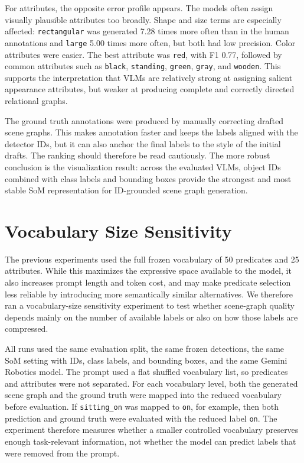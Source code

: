For attributes, the opposite error profile appears. The models often assign visually plausible attributes too broadly. Shape and size terms are especially affected: \texttt{rectangular} was generated 7.28 times more often than in the human annotations and \texttt{large} 5.00 times more often, but both had low precision. Color attributes were easier. The best attribute was \texttt{red}, with F1 0.77, followed by common attributes such as \texttt{black}, \texttt{standing}, \texttt{green}, \texttt{gray}, and \texttt{wooden}. This supports the interpretation that VLMs are relatively strong at assigning salient appearance attributes, but weaker at producing complete and correctly directed relational graphs.

The ground truth annotations were produced by manually correcting drafted scene graphs. This makes annotation faster and keeps the labels aligned with the detector IDs, but it can also anchor the final labels to the style of the initial drafts. The ranking should therefore be read cautiously. The more robust conclusion is the visualization result: across the evaluated VLMs, object IDs combined with class labels and bounding boxes provide the strongest and most stable SoM representation for ID-grounded scene graph generation.

\section{Vocabulary Size Sensitivity}

The previous experiments used the full frozen vocabulary of 50 predicates and 25 attributes. While this maximizes the expressive space available to the model, it also increases prompt length and token cost, and may make predicate selection less reliable by introducing more semantically similar alternatives. We therefore ran a vocabulary-size sensitivity experiment to test whether scene-graph quality depends mainly on the number of available labels or also on how those labels are compressed.

All runs used the same evaluation split, the same frozen detections, the same SoM setting with IDs, class labels, and bounding boxes, and the same Gemini Robotics model. The prompt used a flat shuffled vocabulary list, so predicates and attributes were not separated. For each vocabulary level, both the generated scene graph and the ground truth were mapped into the reduced vocabulary before evaluation. If \texttt{sitting\_on} was mapped to \texttt{on}, for example, then both prediction and ground truth were evaluated with the reduced label \texttt{on}. The experiment therefore measures whether a smaller controlled vocabulary preserves enough task-relevant information, not whether the model can predict labels that were removed from the prompt.

